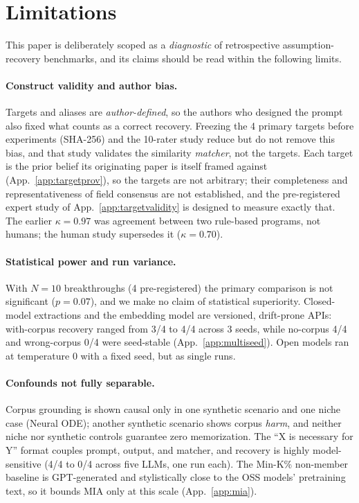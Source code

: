 \documentclass[11pt]{article}
\begin{document}
\section*{Limitations}

This paper is deliberately scoped as a \emph{diagnostic} of retrospective assumption-recovery benchmarks, and its claims should be read within the following limits.

\paragraph{Construct validity and author bias.} Targets and aliases are \emph{author-defined}, so the authors who designed the prompt also fixed what counts as a correct recovery. Freezing the 4 primary targets before experiments (SHA-256) and the 10-rater study reduce but do not remove this bias, and that study validates the similarity \emph{matcher}, not the targets. Each target is the prior belief its originating paper is itself framed against (App.~\ref{app:targetprov}), so the targets are not arbitrary; their completeness and representativeness of field consensus are not established, and the pre-registered expert study of App.~\ref{app:targetvalidity} is designed to measure exactly that. The earlier $\kappa = 0.97$ was agreement between two rule-based programs, not humans; the human study supersedes it ($\kappa = 0.70$).

\paragraph{Statistical power and run variance.} With $N = 10$ breakthroughs (4 pre-registered) the primary comparison is not significant ($p = 0.07$), and we make no claim of statistical superiority. Closed-model extractions and the embedding model are versioned, drift-prone APIs: with-corpus recovery ranged from 3/4 to 4/4 across 3 seeds, while no-corpus 4/4 and wrong-corpus 0/4 were seed-stable (App.~\ref{app:multiseed}). Open models ran at temperature 0 with a fixed seed, but as single runs.

\paragraph{Confounds not fully separable.} Corpus grounding is shown causal only in one synthetic scenario and one niche case (Neural ODE); another synthetic scenario shows corpus \emph{harm}, and neither niche nor synthetic controls guarantee zero memorization. The ``X is necessary for Y'' format couples prompt, output, and matcher, and recovery is highly model-sensitive (4/4 to 0/4 across five LLMs, one run each). The Min-K\% non-member baseline is GPT-generated and stylistically close to the OSS models' pretraining text, so it bounds MIA only at this scale (App.~\ref{app:mia}).
\end{document}
